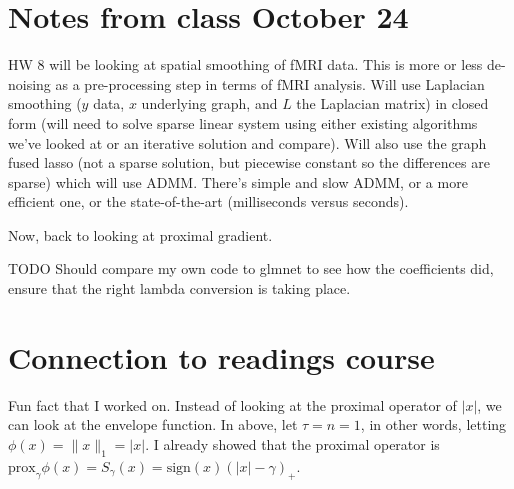\documentclass{article}
\begin{document}
\section{Notes from class October 24}
HW 8 will be looking at spatial smoothing of fMRI data. This is more or less de-noising as a pre-processing step in terms of fMRI analysis.
Will use Laplacian smoothing ($y$ data, $x$ underlying graph, and $L$ the Laplacian matrix)
in closed form (will need to solve sparse linear system using either existing algorithms we've looked at or an iterative solution and compare).
Will also use the graph fused lasso (not a sparse solution, but piecewise constant so the differences are sparse) which will use ADMM. There's
simple and slow ADMM, or a more efficient one, or the state-of-the-art (milliseconds versus seconds).

Now, back to looking at proximal gradient.

TODO Should compare my own code to glmnet to see how the coefficients did,
ensure that the right lambda conversion is taking place.



















\section{Connection to readings course}
Fun fact that I worked on. Instead of looking at the proximal operator of $|x|$, we can look at the envelope function.
In  above, let $\tau=n=1$, in other words, letting $\phi(x)=\lVert x\rVert_1=|x|$. I already showed that the
proximal operator is $\textrm{prox}_\gamma \phi(x)=S_\gamma(x)=\textrm{sign}(x)\left(|x|-\gamma\right)_+$.
\end{document}

